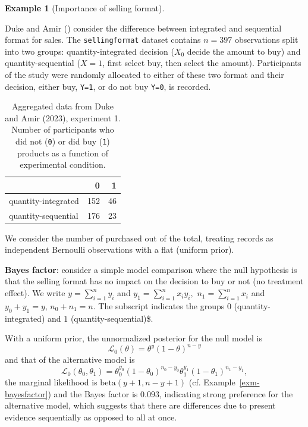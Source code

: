 \documentclass[
  11pt,
  letterpaper,
]{scrbook}
\theoremstyle{definition}
\newtheorem{example}{Example}[chapter]
\theoremstyle{plain}
\theoremstyle{plain}
\theoremstyle{plain}
\theoremstyle{definition}
\theoremstyle{definition}
\theoremstyle{plain}
\theoremstyle{plain}
\theoremstyle{remark}
\begin{document}
\begin{example}[Importance of selling
format]\protect\hypertarget{exm-Duke-Amir}{}\label{exm-Duke-Amir}

Duke and Amir () consider the
difference between integrated and sequential format for sales. The
\texttt{sellingformat} dataset contains \(n=397\) observations split
into two groups: quantity-integrated decision (\(X_0\) decide the amount
to buy) and quantity-sequential (\(X=1\), first select buy, then select
the amount). Participants of the study were randomly allocated to either
of these two format and their decision, either buy, \texttt{Y=1}, or do
not buy \texttt{Y=0}, is recorded.

\begin{longtable}[]{@{}lrr@{}}

\caption{\label{tbl-contingency-sellingformat}Aggregated data from Duke
and Amir (2023), experiment 1. Number of participants who did not
(\texttt{0}) or did buy (\texttt{1}) products as a function of
experimental condition.}

\tabularnewline

\toprule\noalign{}
& 0 & 1 \\
\midrule\noalign{}
\endhead
\bottomrule\noalign{}
\endlastfoot
quantity-integrated & 152 & 46 \\
quantity-sequential & 176 & 23 \\

\end{longtable}

We consider the number of purchased out of the total, treating records
as independent Bernoulli observations with a flat (uniform prior).

\textbf{Bayes factor}: consider a simple model comparison where the null
hypothesis is that the selling format has no impact on the decision to
buy or not (no treatment effect). We write \(y=\sum_{i=1}^n y_i\) and
\(y_1 = \sum_{i=1}^n x_iy_i,\) \(n_1 = \sum_{i=1}^n x_i\) and
\(y_0+y_1=y\), \(n_0+n_1=n.\) The subscript indicates the groups \(0\)
(quantity-integrated) and \(1\) (quantity-sequential)\$.

With a uniform prior, the unnormalized posterior for the null model is
\[\mathcal{L}_0(\theta) = \theta^y(1-\theta)^{n-y}\] and that of the
alternative model is
\[\mathcal{L}_0(\theta_0, \theta_1) = \theta_0^{y_0}(1-\theta_0)^{n_0-y_0}\theta_1^{y_1}(1-\theta_1)^{n_1-y_1},\]
the marginal likelihood is \(\mathrm{beta}(y+1, n-y+1)\) (cf.
Example~\ref{exm-bayesfactor}) and the Bayes factor is \(0.093\),
indicating strong preference for the alternative model, which suggests
that there are differences due to present evidence sequentially as
opposed to all at once.


\end{example}
\end{document}
